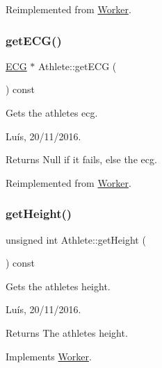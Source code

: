 Reimplemented from \hyperlink{class_worker_ac77905603b86c58cb0a87d6389dca744}{Worker}.

\hypertarget{class_athlete_a9655c13ed4126435df2e57e64884deab}{}\label{class_athlete_a9655c13ed4126435df2e57e64884deab} 
\subsubsection{\texorpdfstring{get\+E\+C\+G()}{getECG()}}
{\footnotesize\ttfamily \hyperlink{class_e_c_g}{E\+CG} $\ast$ Athlete\+::get\+E\+CG (\begin{DoxyParamCaption}{ }\end{DoxyParamCaption}) const\hspace{0.3cm}{\ttfamily [virtual]}}



Gets the athlete\textquotesingle{}s ecg. 

Luís, 20/11/2016. 

\begin{DoxyReturn}{Returns}
Null if it fails, else the ecg. 
\end{DoxyReturn}


Reimplemented from \hyperlink{class_worker_a625cb5da072fd244f38f42e15693058a}{Worker}.

\hypertarget{class_athlete_a54a75ed3943dc6b5e229997be8422466}{}\label{class_athlete_a54a75ed3943dc6b5e229997be8422466} 
\subsubsection{\texorpdfstring{get\+Height()}{getHeight()}}
{\footnotesize\ttfamily unsigned int Athlete\+::get\+Height (\begin{DoxyParamCaption}{ }\end{DoxyParamCaption}) const\hspace{0.3cm}{\ttfamily [virtual]}}



Gets the athlete\textquotesingle{}s height. 

Luís, 20/11/2016. 

\begin{DoxyReturn}{Returns}
The athlete\textquotesingle{}s height. 
\end{DoxyReturn}


Implements \hyperlink{class_worker_a1c5dcdc1c7dc5e498a44f678e964bbfd}{Worker}.

